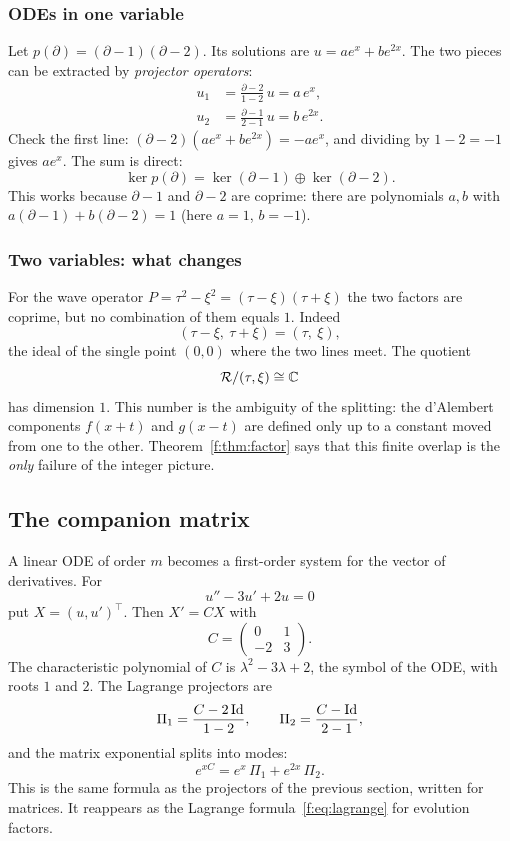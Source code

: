 \subsubsection{ODEs in one variable}

Let $p(\partial)=(\partial-1)(\partial-2)$. Its solutions are $u=ae^x+be^{2x}$. The two pieces can be extracted by \emph{projector operators}:
\begin{align*}
u_1&=\frac{\partial-2}{1-2}\,u=a\,e^{x},\\[3pt]
u_2&=\frac{\partial-1}{2-1}\,u=b\,e^{2x}.
\end{align*}
Check the first line: $(\partial-2)(ae^x+be^{2x})=-ae^x$, and dividing by $1-2=-1$ gives $ae^x$. The sum is direct:
\[
\ker p(\partial)=\ker(\partial-1)\oplus\ker(\partial-2).
\]
This works because $\partial-1$ and $\partial-2$ are coprime: there are polynomials $a,b$ with $a(\partial-1)+b(\partial-2)=1$ (here $a=1$, $b=-1$).

\subsubsection{Two variables: what changes}

For the wave operator $P=\tau^2-\xi^2=(\tau-\xi)(\tau+\xi)$ the two factors are coprime, but no combination of them equals $1$. Indeed
\[
(\tau-\xi,\ \tau+\xi)=(\tau,\ \xi),
\]
the ideal of the single point $(0,0)$ where the two lines meet. The quotient
\[
\mathcal{R}/(\tau,\xi)\cong\mathbb{C}
\]
has dimension $1$. This number is the ambiguity of the splitting: the d'Alembert components $f(x+t)$ and $g(x-t)$ are defined only up to a constant moved from one to the other. Theorem~\ref{f:thm:factor} says that this finite overlap is the \emph{only} failure of the integer picture.

\subsection{The companion matrix}\label{sec:pr-comp}

A linear ODE of order $m$ becomes a first-order system for the vector of derivatives. For
\[
u''-3u'+2u=0
\]
put $X=(u,u')^{\top}$. Then $X'=CX$ with
\[
C=\begin{pmatrix}0&1\\-2&3\end{pmatrix}.
\]
The characteristic polynomial of $C$ is $\lambda^2-3\lambda+2$, the symbol of the ODE, with roots $1$ and $2$. The Lagrange projectors are
\[
\Pi_1=\frac{C-2\,\mathrm{Id}}{1-2},\qquad \Pi_2=\frac{C-\mathrm{Id}}{2-1},
\]
and the matrix exponential splits into modes:
\[
e^{xC}=e^{x}\,\Pi_1+e^{2x}\,\Pi_2 .
\]
This is the same formula as the projectors of the previous section, written for matrices. It reappears as the Lagrange formula~\eqref{f:eq:lagrange} for evolution factors.

